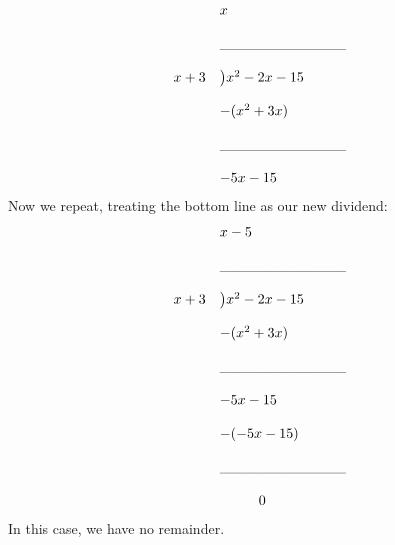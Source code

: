 $$
\begin{array}{rl}
         &       x   \\\\
         &       \text{\textunderscore\textunderscore\textunderscore\textunderscore\textunderscore\textunderscore\textunderscore\textunderscore\textunderscore\textunderscore\textunderscore\textunderscore}  \\\\
   x + 3 & \big) x^2-2x-15 \\\\
         & -(x^2+3x)   \\\\
         &       \text{\textunderscore\textunderscore\textunderscore\textunderscore\textunderscore\textunderscore\textunderscore\textunderscore\textunderscore\textunderscore\textunderscore\textunderscore}  \\\\
         &  -5x-15
\end{array}
$$
Now we repeat, treating the bottom line as our new dividend:
$$
\begin{array}{rl}
         &       x - 5  \\\\
         &       \text{\textunderscore\textunderscore\textunderscore\textunderscore\textunderscore\textunderscore\textunderscore\textunderscore\textunderscore\textunderscore\textunderscore\textunderscore}  \\\\
   x + 3 & \big) x^2-2x-15 \\\\
         & -(x^2+3x)   \\\\
         &       \text{\textunderscore\textunderscore\textunderscore\textunderscore\textunderscore\textunderscore\textunderscore\textunderscore\textunderscore\textunderscore\textunderscore\textunderscore}  \\\\
         &  -5x-15 \\\\
         &  -(-5x-15) \\\\
         &       \text{\textunderscore\textunderscore\textunderscore\textunderscore\textunderscore\textunderscore\textunderscore\textunderscore\textunderscore\textunderscore\textunderscore\textunderscore}  \\\\
         & \phantom{---}0
\end{array}
$$
In this case, we have no remainder.

